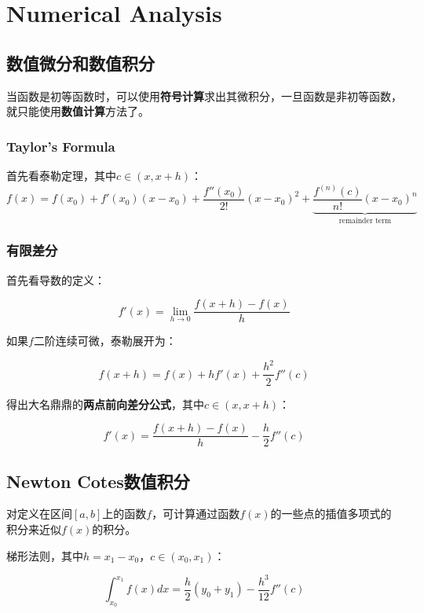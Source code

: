 \chapter{Numerical Analysis}

\section{数值微分和数值积分}
当函数是初等函数时，可以使用\textbf{符号计算}求出其微积分，一旦函数是非初等函数，就只能使用\textbf{数值计算}方法了。

\subsection{Taylor's Formula}
首先看泰勒定理，其中$ c\in(x,x+h) $：
\begin{equation}
f(x) =f(x_0)+f'(x_0)(x-x_0) + \frac{f''(x_0)}{2!}(x-x_0)^2 +
\underbrace{\frac{f^{(n)}(c)}{n!}(x-x_0)^n}_{\text{remainder term}}
\end{equation}

\subsection{有限差分}
首先看导数的定义：

\begin{equation}
f'(x) = \lim_{h\rightarrow 0} \frac{f(x+h)-f(x)}{h}
\end{equation}

如果$ f $二阶连续可微，泰勒展开为：

\begin{equation}
f(x+h) = f(x)+hf'(x)+\frac{h^2}{2}f''(c)
\end{equation}

得出大名鼎鼎的\textbf{两点前向差分公式}，其中$ c\in(x,x+h) $：

\begin{equation}
f'(x) = \frac{f(x+h)-f(x)}{h} - \frac{h}{2}f''(c)
\end{equation}

\section{Newton Cotes数值积分}
对定义在区间$ [a,b] $上的函数$ f $，可计算通过函数$ f(x) $的一些点的插值多项式的积分来近似$ f(x) $的积分。

梯形法则，其中$ h=x_1-x_0 $，$ c\in(x_0,x_1) $：

\begin{equation}
\int_{x_0}^{x_1}f(x)dx = \frac{h}{2}(y_0 + y_1) - \frac{h^3}{12}f''(c)
\end{equation}

